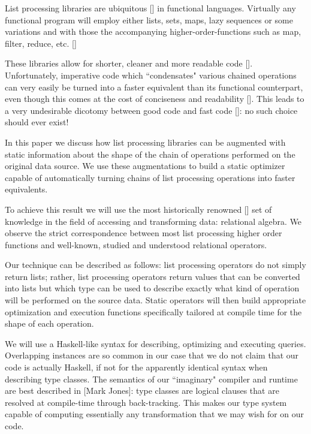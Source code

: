 
List processing libraries are ubiquitous [] in functional languages. Virtually any functional program will employ either lists, sets, maps, lazy sequences or some variations and with those the accompanying higher-order-functions such as map, filter, reduce, etc. []

These libraries allow for shorter, cleaner and more readable code []. Unfortunately, imperative code which ``condensates" various chained operations can very easily be turned into a faster equivalent than its functional counterpart, even though this comes at the cost of conciseness and readability []. This leads to a very undesirable dicotomy between good code and fast code []: no such choice should ever exist!

In this paper we discuss how list processing libraries can be augmented with static information about the shape of the chain of operations performed on the original data source. We use these augmentations to build a static optimizer capable of automatically turning chains of list processing operations into faster equivalents.

To achieve this result we will use the most historically renowned [] set of knowledge in the field of accessing and transforming data: relational algebra. We observe the strict correspondence between most list processing higher order functions and well-known, studied and understood relational operators.

Our technique can be described as follows: list processing operators do not simply return lists; rather, list processing operators return values that can be converted into lists but which type can be used to describe exactly what kind of operation will be performed on the source data. Static operators will then build appropriate optimization and execution functions specifically tailored at compile time for the shape of each operation.

We will use a Haskell-like syntax for describing, optimizing and executing queries. Overlapping instances are so common in our case that we do not claim that our code is actually Haskell, if not for the apparently identical syntax when describing type classes. The semantics of our ``imaginary" compiler and runtime are best described in [Mark Jones]: type classes are logical clauses that are resolved at compile-time through back-tracking. This makes our type system capable of computing essentially any transformation that we may wish for on our code.

